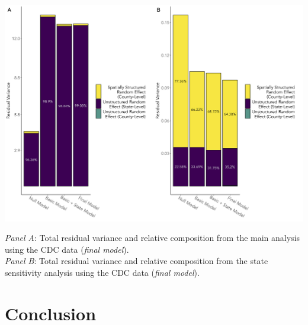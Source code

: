 \documentclass[aspectratio=169]{beamer}
\begin{document}
\begin{frame}
		
\centering
		\vspace*{-0.19 cm}

		\includegraphics[scale=0.082]{images-logos/compare-cdc-res-var.png}
		
	
		
		\tiny{\textit{Panel A}: Total residual variance and relative composition from the main analysis using the CDC data (\textit{final model}).\\
			\textit{Panel B}: Total residual variance and relative composition from the state sensitivity analysis using the CDC data (\textit{final model}).}
			
\end{frame}

\section{Conclusion}
\end{document}
